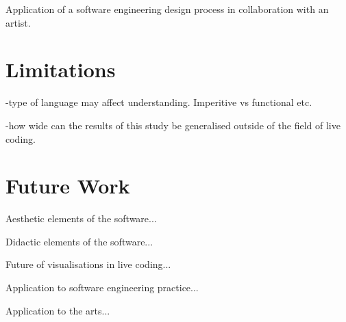 Application of a software engineering design process in collaboration with an artist.

\section{Limitations}

-type of language may affect understanding. Imperitive vs functional etc.

-how wide can the results of this study be generalised outside of the field of live coding.

\section{Future Work}

Aesthetic elements of the software...

Didactic elements of the software...

Future of visualisations in live coding...

Application to software engineering practice...

Application to the arts...

